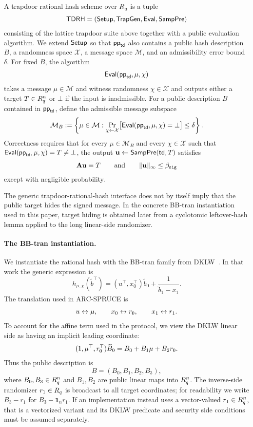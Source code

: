 \begin{definition}\label{def:trapdoor-rational-hash}
A trapdoor rational hash scheme over $R_q$ is a tuple
\[
  \mathsf{TDRH}=(\mathsf{Setup},\mathsf{TrapGen},\mathsf{Eval},\mathsf{SampPre})
\]
consisting of the lattice trapdoor suite above together with a public evaluation algorithm.  We extend
$\mathsf{Setup}$ so that $\mathsf{pp}_{\mathsf{td}}$ also contains a public hash description $B$, a randomness space
$\mathcal X$, a message space $\mathcal M$, and an admissibility error bound $\delta$.  For fixed $B$, the
algorithm
\[
  \mathsf{Eval}(\mathsf{pp}_{\mathsf{td}},\mu,\chi)
\]
takes a message $\mu\in\mathcal M$ and witness randomness $\chi\in\mathcal X$ and outputs either a target
$T\in R_q^n$ or $\bot$ if the input is inadmissible.  For a public description $B$ contained in
$\mathsf{pp}_{\mathsf{td}}$, define the admissible message subspace
\[
  \mathcal M_B:=\left\{\mu\in\mathcal M:
    \Pr_{\chi\gets \mathcal X}\bigl[\mathsf{Eval}(\mathsf{pp}_{\mathsf{td}},\mu,\chi)=\bot\bigr]\le \delta
  \right\}.
\]
Correctness requires that for every $\mu\in\mathcal M_B$ and every $\chi\in\mathcal X$ such that
$\mathsf{Eval}(\mathsf{pp}_{\mathsf{td}},\mu,\chi)=T\neq\bot$, the output
$\mathbf{u}\gets\mathsf{SampPre}(\mathsf{td},T)$ satisfies
\[
  \mathbf{A}\mathbf{u}=T
  \qquad\text{and}\qquad
  \|\mathbf{u}\|_\infty\le \beta_{\mathtt{sig}}
\]
except with negligible probability.
\end{definition}

The generic trapdoor-rational-hash interface does not by itself imply that the public target hides the signed
message.  In the concrete BB-tran instantiation used in this paper, target hiding is obtained later from a
cyclotomic leftover-hash lemma applied to the long linear-side randomizer.

\paragraph{The BB-tran instantiation.}
We instantiate the rational hash with the BB-tran family from DKLW~\cite[Table~1]{EPRINT:DKLW25}.  In
that work the generic expression is
\[
  h_{\mu,\chi}(\tilde b^\top)
  =
  (u^\top,x_0^\top)\tilde b_0+\frac{1}{\tilde b_1-x_1}.
\]
The translation used in ARC-SPRUCE is
\[
  u\leftrightarrow \mathbf{\mu},\qquad
  x_0\leftrightarrow r_0,\qquad
  x_1\leftrightarrow r_1.
\]
To account for the affine term used in the protocol, we view the DKLW linear side as having an implicit
leading coordinate:
\[
  (1,\mathbf{\mu}^\top,r_0^\top)\widehat B_0
  =
  B_0+B_1\mathbf{\mu}+B_2r_0.
\]
Thus the public description is
\[
  B=(B_0,B_1,B_2,B_3),
\]
where $B_0,B_3\in R_q^n$ and $B_1,B_2$ are public linear maps into $R_q^n$.  The inverse-side
randomizer $r_1\in R_q$ is broadcast to all target coordinates; for readability we write $B_3-r_1$ for
$B_3-\mathbf 1_n r_1$.  If an implementation instead uses a vector-valued $r_1\in R_q^n$, that is a
vectorized variant and its DKLW predicate and security side conditions must be assumed separately.

